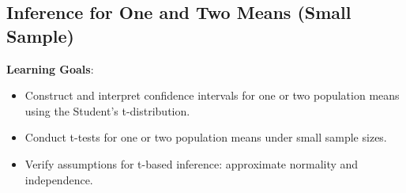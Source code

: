 \documentclass{article}
\begin{document}

\subsection{Inference for One and Two Means (Small Sample)}
\textbf{Learning Goals}:
\begin{itemize}
    \item Construct and interpret confidence intervals for one or two population means using the Student's t-distribution.
    \item Conduct t-tests for one or two population means under small sample sizes.
    \item Verify assumptions for t-based inference: approximate normality and independence.
\end{itemize}
\end{document}

